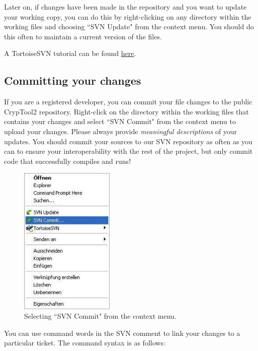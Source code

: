 Later on, if changes have been made in the repository and you want to update your working copy, you can do this by right-clicking on any directory within the working files and choosing ``SVN Update" from the context menu. You should do this often to maintain a current version of the files.

A TortoiseSVN tutorial can be found \href{http://www.mind.ilstu.edu/research/robots/iris4/developers/svntutorial}{here}.

\subsection*{Committing your changes}
\label{CommitingYourChanges}

If you are a registered developer, you can commit your file changes to the public CrypTool2 repository. Right-click on the directory within the working files that contains your changes and select ``SVN Commit" from the context menu to upload your changes. Please always provide \textit{meaningful descriptions} of your updates. You should commit your sources to our SVN repository as often as you can to ensure your interoperability with the rest of the project, but only commit code that successfully compiles and runs!

\begin{figure}[h!]
	\centering
		\includegraphics[width=0.40\textwidth]{figures/tortoise_svn_commit.jpg}
	\caption{Selecting ``SVN Commit" from the context menu.}
	\label{fig:tortoise_svn_commit}
\end{figure}

You can use command words in the SVN comment to link your changes to a particular ticket. The command syntax is as follows:

